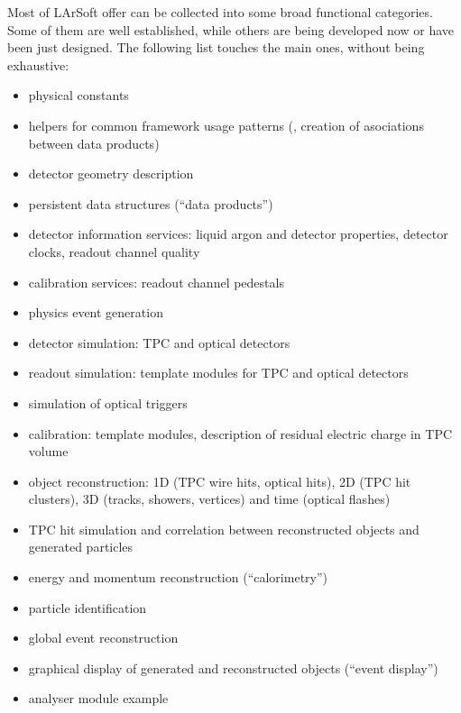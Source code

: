 Most of LArSoft offer can be collected into some broad functional categories.
Some of them are well established, while others are being developed now or have been just designed.
The following list touches the main ones, without being exhaustive:
\begin{itemize}
	\item physical constants
	\item helpers for common framework usage patterns (\eg, creation of asociations between data products)
	\item detector geometry description
	\item persistent data structures (``data products'')
	\item detector information services: liquid argon and detector properties, detector clocks, readout channel quality
	\item calibration services: readout channel pedestals
	\item physics event generation
	\item detector simulation: TPC and optical detectors
	\item readout simulation: template modules for TPC and optical detectors
	\item simulation of optical triggers
	\item calibration: template modules, description of residual electric charge in TPC volume
	\item object reconstruction: 1D (TPC wire hits, optical hits), 2D (TPC hit clusters), 3D (tracks, showers, vertices) and time (optical flashes)
	\item TPC hit simulation and correlation between reconstructed objects and generated particles
	\item energy and momentum reconstruction (``calorimetry'')
	\item particle identification
	\item global event reconstruction
	\item graphical display of generated and reconstructed objects (``event display'')
	\item analyser module example
\end{itemize}


